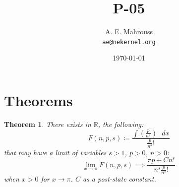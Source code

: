 \documentclass[11pt, a4paper]{article}
\title{P-05}
\author{A. E. Mahrouss\\\texttt{ae@nekernel.org}}
\date{\today}
\theoremstyle{plain}
\newtheorem{theorem}{Theorem}[section]
\theoremstyle{definition}
\theoremstyle{remark}
\begin{document}
\twocolumn[{%
  \maketitle
  \vspace{-0.5em}
  \vspace{0.8em}
  \rule{\linewidth}{0.4pt}
  \vspace{1em}
}]

\maketitle

\section{Theorems}
\begin{theorem}
There exists in $\mathbb{R}$, the following:
\begin{equation}
F(n, p, s) \coloneq \frac{\int (\frac{p}{n^{s}}) \text{ } dx}{\frac{p}{n^{s}}! }
\end{equation}
that may have a limit of variables $s>1$, $p>0$, $n>0$:
\begin{equation}
  \lim_{x \to \pi} F(n, p, s) \implies \frac{\pi p+Cn^s}{n^s\frac{p}{n^s}!}
\end{equation}
when $x > 0$ for $x \to \pi$. $C$ as a post-state constant. 
\end{theorem}

\nocite{*}



\end{document}
